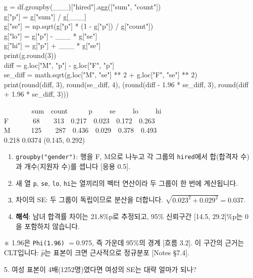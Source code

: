 \documentclass[11pt,a4paper]{article}
\newcommand{\code}[1]{\texttt{#1}}
\newcommand{\aside}[1]{{\footnotesize\color{black!65}#1}}
\newcommand{\Wc}[1]{{\scriptsize\textsf{\color{blue!60!black}[흐름 #1]}}}
\newcommand{\Hc}[1]{{\scriptsize\textsf{\color{orange!70!black}[응용 #1]}}}
\newcommand{\Nc}[1]{{\scriptsize\textsf{\color{violet!70!black}[Notes #1]}}}
\begin{document}
\begin{codebox}
g = df.groupby(\_\_\_)["hired"].agg(["sum", "count"])\\
g["p"] = g["sum"] / g[\_\_\_]\\
g["se"] = np.sqrt(g["p"] * (1 - g["p"]) / g["count"])\\
g["lo"] = g["p"] - \_\_\_ * g["se"]\\
g["hi"] = g["p"] + \_\_\_ * g["se"]\\
print(g.round(3))\\[3pt]
diff = g.loc["M", "p"] - g.loc["F", "p"]\\
se\_diff = math.sqrt(g.loc["M", "se"] ** 2 + g.loc["F", "se"] ** 2)\\
print(round(diff, 3), round(se\_diff, 4), (round(diff - 1.96 * se\_diff, 3), round(diff + 1.96 * se\_diff, 3)))
\end{codebox}
\begin{outbox}
\ \ \ \ \ \ \ \ sum\ \ count\ \ \ \ \ \ p\ \ \ \ \ se\ \ \ \ \ lo\ \ \ \ \ hi\\
F\ \ \ \ \ \ \ 68\ \ \ \ 313\ \ 0.217\ \ 0.023\ \ 0.172\ \ 0.263\\
M\ \ \ \ \ \ 125\ \ \ \ 287\ \ 0.436\ \ 0.029\ \ 0.378\ \ 0.493\\
0.218 0.0374 (0.145, 0.292)
\end{outbox}

\begin{howbox}
\begin{enumerate}
\item \code{groupby("gender")}: 행을 F, M으로 나누고 각 그룹의 \code{hired}에서 합(합격자 수)과 개수(지원자 수)를 셉니다 \Hc{0.5}.
\item 새 열 \code{p}, \code{se}, \code{lo}, \code{hi}는 열끼리의 벡터 연산이라 두 그룹이 한 번에 계산됩니다.
\item 차이의 SE: 두 그룹이 독립이므로 분산을 더합니다. $\sqrt{0.023^2+0.029^2}=0.037$.
\item \textbf{해석}: 남녀 합격률 차이는 21.8\%p로 추정되고, 95\% 신뢰구간 [14.5, 29.2]\%p는 0을 포함하지 않습니다.
\end{enumerate}
\end{howbox}
\aside{※ 1.96은 \code{Phi(1.96)} $=0.975$, 즉 가운데 95\%의 경계 \Wc{3.2}. 이 구간의 근거는 CLT입니다: $\hat p$는 표본이 크면 근사적으로 정규분포 \Nc{§7.4}.}

\begin{qbox}
5. 여성 표본이 4배(1252명)였다면 여성의 SE는 대략 얼마가 되나?
\end{qbox}
\end{document}
